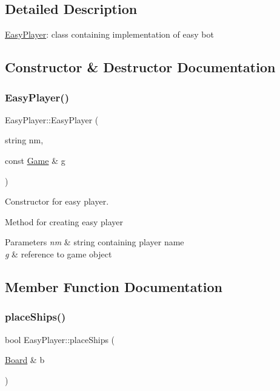 \subsection{Detailed Description}
\mbox{\hyperlink{class_easy_player}{Easy\+Player}}\+: class containing implementation of easy bot 

\subsection{Constructor \& Destructor Documentation}
\mbox{\label{class_easy_player_a6ab4cbdc4e8e353e0dbecb9c2c4e3f7c}} 
\subsubsection{\texorpdfstring{Easy\+Player()}{EasyPlayer()}}
{\footnotesize\ttfamily Easy\+Player\+::\+Easy\+Player (\begin{DoxyParamCaption}\item[{string}]{nm,  }\item[{const \mbox{\hyperlink{class_game}{Game}} \&}]{g }\end{DoxyParamCaption})}



Constructor for easy player. 

Method for creating easy player 
\begin{DoxyParams}{Parameters}
{\em nm} & string containing player name \\
\hline
{\em g} & reference to game object \\
\hline
\end{DoxyParams}


\subsection{Member Function Documentation}
\mbox{\label{class_easy_player_a4b9d5815113f393615412f7a98176a6c}} 
\subsubsection{\texorpdfstring{place\+Ships()}{placeShips()}}
{\footnotesize\ttfamily bool Easy\+Player\+::place\+Ships (\begin{DoxyParamCaption}\item[{\mbox{\hyperlink{class_board}{Board}} \&}]{b }\end{DoxyParamCaption})\hspace{0.3cm}{\ttfamily [virtual]}}



